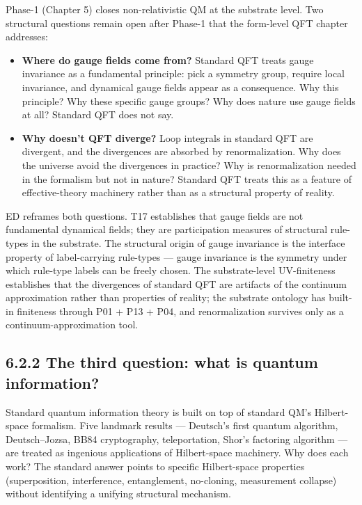\documentclass[11pt]{book}
\begin{document}
Phase-1 (Chapter 5) closes non-relativistic QM at the substrate level. Two structural questions remain open after Phase-1 that the form-level QFT chapter addresses:

\begin{itemize}
\item \textbf{Where do gauge fields come from?} Standard QFT treats gauge invariance as a fundamental principle: pick a symmetry group, require local invariance, and dynamical gauge fields appear as a consequence. Why this principle? Why these specific gauge groups? Why does nature use gauge fields at all? Standard QFT does not say.
\item \textbf{Why doesn't QFT diverge?} Loop integrals in standard QFT are divergent, and the divergences are absorbed by renormalization. Why does the universe avoid the divergences in practice? Why is renormalization needed in the formalism but not in nature? Standard QFT treats this as a feature of effective-theory machinery rather than as a structural property of reality.
\end{itemize}

ED reframes both questions. T17 establishes that gauge fields are not fundamental dynamical fields; they are participation measures of structural rule-types in the substrate. The structural origin of gauge invariance is the interface property of label-carrying rule-types — gauge invariance is the symmetry under which rule-type labels can be freely chosen. The substrate-level UV-finiteness establishes that the divergences of standard QFT are artifacts of the continuum approximation rather than properties of reality; the substrate ontology has built-in finiteness through P01 + P13 + P04, and renormalization survives only as a continuum-approximation tool.

\subsection{6.2.2 The third question: what is quantum information?}

Standard quantum information theory is built on top of standard QM's Hilbert-space formalism. Five landmark results — Deutsch's first quantum algorithm, Deutsch–Jozsa, BB84 cryptography, teleportation, Shor's factoring algorithm — are treated as ingenious applications of Hilbert-space machinery. Why does each work? The standard answer points to specific Hilbert-space properties (superposition, interference, entanglement, no-cloning, measurement collapse) without identifying a unifying structural mechanism.
\end{document}
